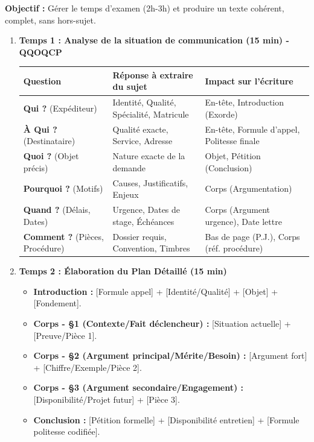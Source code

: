\documentclass[11pt]{article}
\begin{document}
\begin{methode}
\textbf{Objectif :} Gérer le temps d'examen (2h-3h) et produire un texte cohérent, complet, sans hors-sujet.
\begin{enumerate}
    \item \textbf{Temps 1 : Analyse de la situation de communication (15 min) - QQOQCP}
    \begin{center}
        \begin{tabular}{|l|l|l|}
        \hline
        \textbf{Question} & \textbf{Réponse à extraire du sujet} & \textbf{Impact sur l'écriture} \\
        \hline
        \textbf{Qui ?} (Expéditeur) & Identité, Qualité, Spécialité, Matricule & En-tête, Introduction (Exorde) \\
        \textbf{À Qui ?} (Destinataire) & Qualité exacte, Service, Adresse & En-tête, Formule d'appel, Politesse finale \\
        \textbf{Quoi ?} (Objet précis) & Nature exacte de la demande & Objet, Pétition (Conclusion) \\
        \textbf{Pourquoi ?} (Motifs) & Causes, Justificatifs, Enjeux & Corps (Argumentation) \\
        \textbf{Quand ?} (Délais, Dates) & Urgence, Dates de stage, Échéances & Corps (Argument urgence), Date lettre \\
        \textbf{Comment ?} (Pièces, Procédure) & Dossier requis, Convention, Timbres & Bas de page (P.J.), Corps (réf. procédure) \\
        \hline
    \end{tabular}
    \end{center}
    \item \textbf{Temps 2 : Élaboration du Plan Détaillé (15 min)}
    \begin{itemize}
        \item \textbf{Introduction :} [Formule appel] + [Identité/Qualité] + [Objet] + [Fondement].
        \item \textbf{Corps - §1 (Contexte/Fait déclencheur) :} [Situation actuelle] + [Preuve/Pièce 1].
        \item \textbf{Corps - §2 (Argument principal/Mérite/Besoin) :} [Argument fort] + [Chiffre/Exemple/Pièce 2].
        \item \textbf{Corps - §3 (Argument secondaire/Engagement) :} [Disponibilité/Projet futur] + [Pièce 3].
        \item \textbf{Conclusion :} [Pétition formelle] + [Disponibilité entretien] + [Formule politesse codifiée].

\end{itemize}
\end{enumerate}
\end{methode}
\end{document}
